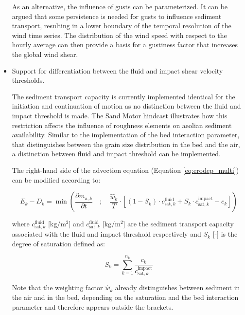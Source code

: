 \begin{itemize}
  As an alternative, the influence of gusts can be parameterized. It
  can be argued that some persistence is needed for gusts to influence
  sediment transport, resulting in a lower boundary of the temporal
  resolution of the wind time series. The distribution of the wind
  speed with respect to the hourly average can then provide a basis
  for a gustiness factor that increases the global wind shear.

\item Support for differentiation between the fluid and impact shear
  velocity thresholds.

  The sediment transport capacity is currently implemented identical
  for the initiation and continuation of motion as no distinction
  between the fluid and impact threshold is made. The Sand Motor
  hindcast illustrates how this restriction affects the influence of
  roughness elements on aeolian sediment availability. Similar to the
  implementation of the bed interaction parameter, that distinguishes
  between the grain size distribution in the bed and the air, a
  distinction between fluid and impact threshold can be implemented.

  The right-hand side of the advection equation (Equation
  \ref{eq:erodep_multi}) can be modified according to:

  \begin{equation}
    \label{eq:erodep_split}
    E_k - D_k = \min \left( 
      \frac{\partial m_{\mathrm{a},k}}{\partial t} \quad ; \quad 
      \frac{\hat{w}_k}{T} \cdot \left[
        (1 - S_k) \cdot c^{\mathrm{fluid}}_{\mathrm{sat},k} +
        S_k \cdot c^{\mathrm{impact}}_{\mathrm{sat},k} - c_k
      \right]
    \right)
  \end{equation}

  \noindent where $c^{\mathrm{fluid}}_{\mathrm{sat},k}$
  [$\mathrm{kg/m^2}$] and $c^{\mathrm{fluid}}_{\mathrm{sat},k}$
  [$\mathrm{kg/m^2}$] are the sediment transport capacity associated
  with the fluid and impact threshold respectively and $S_k$ [-] is
  the degree of saturation defined as:

  \begin{equation}
    S_k = \sum_{k=1}^{n_{\mathrm{k}}} \frac{c_k}{c^{\mathrm{impact}}_{\mathrm{sat},k}}
  \end{equation}

  \noindent Note that the weighting factor $\hat{w}_k$ already
  distinguishes between sediment in the air and in the bed, depending
  on the saturation and the bed interaction parameter and therefore
  appears outside the brackets.


\end{itemize}
